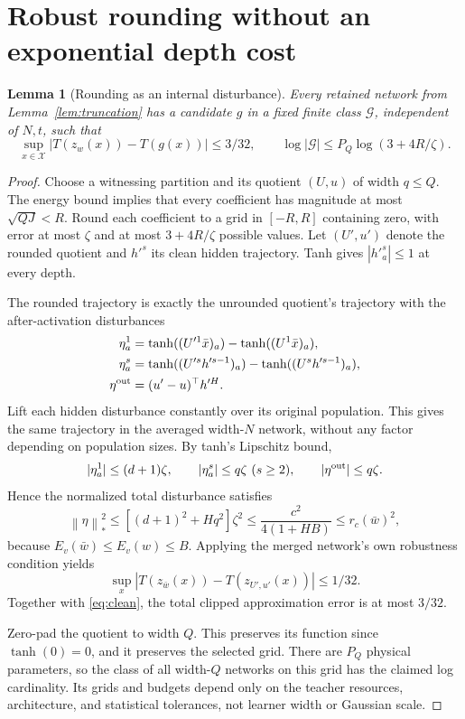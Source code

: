 \documentclass[11pt]{article}
\newtheorem{lemma}[theorem]{Lemma}
\newcommand{\norm}[1]{\left\|#1\right\|}
\begin{document}
\section{Robust rounding without an exponential depth cost}

\begin{lemma}[Rounding as an internal disturbance]\label{lem:rounding}
Every retained network from Lemma~\ref{lem:truncation} has a candidate
$g$ in a fixed finite class $\mathcal G$, independent of $N,t$, such that
\[
 \sup_{x\in\mathcal X}|T(z_w(x))-T(g(x))|\le3/32,
 \qquad \log|\mathcal G|\le P_Q\log(3+4R/\zeta).
\]
\end{lemma}
\begin{proof}
Choose a witnessing partition and its quotient $(U,u)$ of width $q\le Q$.
The energy bound implies that every coefficient has magnitude at most
$\sqrt{QJ}<R$. Round each coefficient to a grid in $[-R,R]$ containing
zero, with error at most $\zeta$ and at most $3+4R/\zeta$ possible values.
Let $(U',u')$ denote the rounded quotient and $h'^s$ its clean hidden
trajectory. Tanh gives $|h'^s_a|\le1$ at every depth.

The rounded trajectory is exactly the unrounded quotient's trajectory
with the after-activation disturbances
\begin{align*}
 \eta^1_a&=\tanh((U'^1\bar x)_a)-\tanh((U^1\bar x)_a),\\
 \eta^s_a&=\tanh((U'^sh'^{s-1})_a)-\tanh((U^sh'^{s-1})_a),\\
 \eta^{\rm out}&=(u'-u)^\top h'^H.
\end{align*}
Lift each hidden disturbance constantly over its original population.
This gives the same trajectory in the averaged width-$N$ network, without
any factor depending on population sizes. By tanh's Lipschitz bound,
\[
 |\eta^1_a|\le(d+1)\zeta,\qquad
 |\eta^s_a|\le q\zeta\ (s\ge2),\qquad
 |\eta^{\rm out}|\le q\zeta.
\]
Hence the normalized total disturbance satisfies
\[
 \norm\eta_*^2\le[(d+1)^2+Hq^2]\zeta^2
 \le\frac{c^2}{4(1+HB)}\le r_c(\bar w)^2,
\]
because $E_v(\bar w)\le E_v(w)\le B$.
Applying the merged network's own robustness condition yields
\[
 \sup_x|T(z_{\bar w}(x))-T(z_{U',u'}(x))|\le1/32.
\]
Together with \eqref{eq:clean}, the total clipped approximation error is
at most $3/32$.

Zero-pad the quotient to width $Q$. This preserves its function since
$\tanh(0)=0$, and it preserves the selected grid. There are $P_Q$ physical
parameters, so the class of all width-$Q$ networks on this grid has the
claimed log cardinality. Its grids and budgets depend only on the teacher
resources, architecture, and statistical tolerances, not learner width or
Gaussian scale.
\end{proof}
\end{document}
